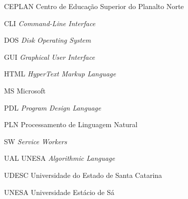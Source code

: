 
\begin{siglas}
  \item[CEPLAN] Centro de Educação Superior do Planalto Norte
  \item[CLI] \textit{Command-Line Interface}
  \item[DOS] \textit{Disk Operating System}
  \item[GUI] \textit{Graphical User Interface}
  \item[HTML] \textit{HyperText Markup Language}
  \item[MS] Microsoft
  \item[PDL] \textit{Program Design Language}
  \item[PLN] Processamento de Linguagem Natural
  \item[SW] \textit{Service Workers}
  \item[UAL] UNESA \textit{Algorithmic Language}
  \item[UDESC] Universidade do Estado de Santa Catarina
  \item[UNESA] Universidade Estácio de Sá
\end{siglas}
